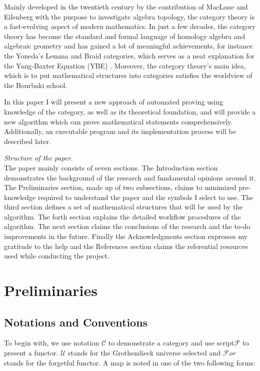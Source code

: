 \documentclass{article}
\begin{document}
Mainly developed in the twentieth century by the contribution of MacLane and Eilenberg with the purpose to investigate algebra topology, the category theory is a fast-evolving aspect of modern mathematics. In just a few decades, the category theory has become the standard and formal language of homology algebra and algebraic geometry and has gained a lot of meaningful achievements, for instance the Yoneda{'}s Lemma and Braid categories, which serves as a neat explanation for the Yang-Baxter Equation (YBE) \cite{1}. Moreover, the category theory{'}s main idea, which is to put mathematical structures into categories satisfies the worldview of the Bourbaki school.

In this paper I will present a new approach of automated proving using knowledge of the category, as well as its theoretical foundation, and will provide a new algorithm which can prove mathematical statements comprehensively. Additionally, an executable program and its implementation process will be described later.

\textit{ Structure of the paper.}\\
The paper mainly consists of seven sections. The Introduction section demonstrates the background of the research and fundamental opinions around it. The Preliminaries section, made up of two subsections, claims to minimized pre-knowledge required to understand the paper and the symbols I select to use. The third section defines a set of mathematical structures that will be used by the algorithm. The forth section explains the detailed workflow procedures of the algorithm. The next section claims the conclusions of the research and the to-do improvements in the future. Finally the Acknowledgments section expresses my gratitude to the help and the References section claims the referential resources used while conducting the project.

\section*{Preliminaries}

\subsection*{Notations and Conventions}

To begin with, we use notation \(\mathcal{C}\) to demonstrate a category and use script\(\mathcal{F}\) to present a functor. \(\mathcal{U}\) stands for the Grothendieck universe selected and \(\mathcal{F}\mathit{o}\mathit{r}\) stands for the forgetful functor. A map is noted in one of the two following forms:
\end{document}
